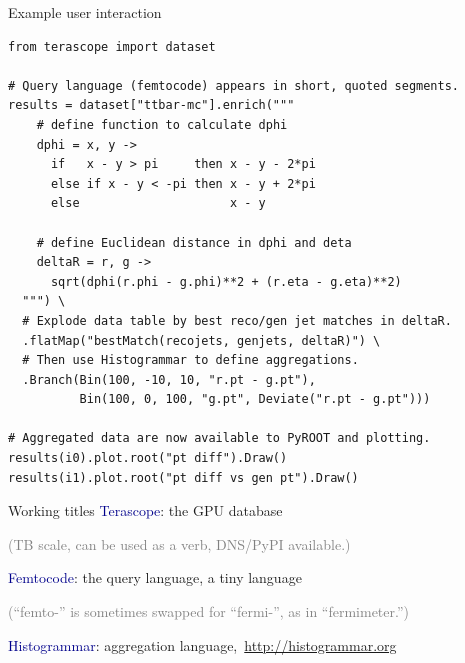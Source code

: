\documentclass{beamer}
\begin{document}
\begin{frame}[fragile]{Example user interaction}
\vspace{0.25 cm}
\scriptsize
\begin{verbatim}
from terascope import dataset

# Query language (femtocode) appears in short, quoted segments.
results = dataset["ttbar-mc"].enrich("""
    # define function to calculate dphi
    dphi = x, y ->
      if   x - y > pi     then x - y - 2*pi
      else if x - y < -pi then x - y + 2*pi
      else                     x - y

    # define Euclidean distance in dphi and deta
    deltaR = r, g ->
      sqrt(dphi(r.phi - g.phi)**2 + (r.eta - g.eta)**2)
  """) \
  # Explode data table by best reco/gen jet matches in deltaR.
  .flatMap("bestMatch(recojets, genjets, deltaR)") \
  # Then use Histogrammar to define aggregations.
  .Branch(Bin(100, -10, 10, "r.pt - g.pt"),
          Bin(100, 0, 100, "g.pt", Deviate("r.pt - g.pt")))

# Aggregated data are now available to PyROOT and plotting.
results(i0).plot.root("pt diff").Draw()
results(i1).plot.root("pt diff vs gen pt").Draw()
\end{verbatim}
\end{frame}

\begin{frame}{Working titles}
\textcolor{darkblue}{Terascope}: the GPU database

\textcolor{gray}{(TB scale, can be used as a verb, DNS/PyPI available.)}

\vspace{0.5 cm}
\textcolor{darkblue}{Femtocode}: the query language, a tiny language

\vspace{0.1 cm}
\textcolor{gray}{(``femto-'' is sometimes swapped for ``fermi-'', as in ``fermimeter.'')}

\vspace{0.5 cm}
\textcolor{darkblue}{Histogrammar}: aggregation \mbox{language, \small \textcolor{blue}{\url{http://histogrammar.org}}\hspace{-2 cm}}
\end{frame}
\end{document}
